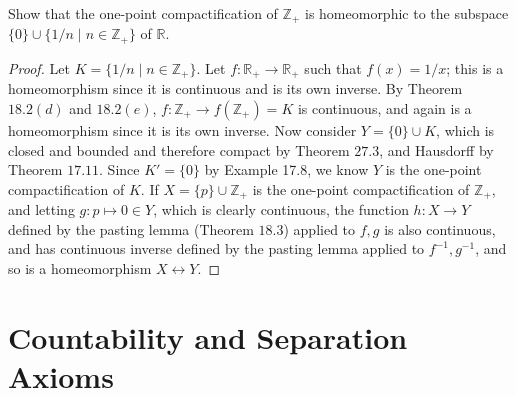 \documentclass[12pt]{article}
\theoremstyle{remark}
\begin{document}
\setcounter{subsubsection}{7}
\begin{problem}
  Show that the one-point compactification of $\mathbb{Z}_+$ is homeomorphic to the subspace $\{0\} \cup \{1/n \mid n \in \mathbb{Z}_+\}$ of $\mathbb{R}$.
\end{problem}
\begin{proof}
  Let $K = \{1/n \mid n \in \mathbb{Z}_+\}$. Let $f\colon \mathbb{R}_+ \to
  \mathbb{R}_+$ such that $f(x) = 1/x$; this is a homeomorphism since it is
  continuous and is its own inverse. By Theorem $18.2(d)$ and $18.2(e)$,
  $f\colon \mathbb{Z}_+ \to f(\mathbb{Z}_+) = K$ is continuous, and again is a
  homeomorphism since it is its own inverse. Now consider $Y = \{0\} \cup K$,
  which is closed and bounded and therefore compact by Theorem $27.3$, and
  Hausdorff by Theorem $17.11$. Since $K' = \{0\}$ by Example 17.8, we know
  $Y$ is the one-point compactification of $K$. If $X = \{p\} \cup \mathbb{Z}_+$
  is the one-point compactification of $\mathbb{Z}_+$, and letting $g\colon p
  \mapsto 0 \in Y$, which is clearly continuous, the function $h\colon X \to Y$ defined by the pasting lemma (Theorem $18.3$) applied to $f,g$ is also continuous, and has continuous inverse defined by the pasting lemma applied to $f^{-1},g^{-1}$, and so is a homeomorphism $X \leftrightarrow Y$.
\end{proof}

\section{Countability and Separation Axioms}
\setcounter{subsection}{29}
\end{document}
